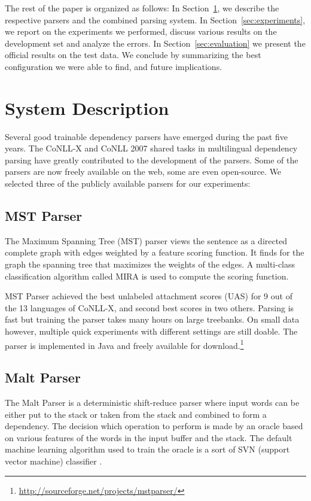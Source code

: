 \documentclass[11pt]{article}
\def\Sref#1{Section~\ref{#1}}
\def\microsection#1{{\bf #1.}}
\begin{document}
The rest of the paper is organized as follows: In \Sref{sec:system}, we describe the respective parsers and the combined parsing system. In \Sref{sec:experiments}, we report on the experiments we performed, discuss various results on the development set and analyze the errors. In \Sref{sec:evaluation} we present the official results on the test data. We conclude by summarizing the best configuration we were able to find, and future implications.

\section{System Description}
\label{sec:system}

Several good trainable dependency parsers have emerged during the past five years. The CoNLL-X \citep{buchholz-marsi:2006:CoNLL-X} and CoNLL 2007 \citep{nivre-EtAl:2007:EMNLP-CoNLL2007} shared tasks in multilingual dependency parsing have greatly contributed to the development of the parsers. Some of the parsers are now freely available on the web, some are even open-source. We selected three of the publicly available parsers for our experiments:

\subsection{MST Parser}
\label{sec:mst}
The Maximum Spanning Tree (MST) parser \citep{mst} views the sentence as a directed complete graph with edges weighted by a feature scoring function. It finds for the graph the spanning tree that maximizes the weights of the edges. A multi-class classification algorithm called MIRA is used to compute the scoring function.

MST Parser achieved the best unlabeled attachment scores (UAS) for 9 out of the 13 languages of CoNLL-X, and second best scores in two others. Parsing is fast but training the parser takes many hours on large treebanks. On small data however, multiple quick experiments with different settings are still doable. The parser is implemented in Java and freely available for download.\footnote{\url{http://sourceforge.net/projects/mstparser/}}

\subsection{Malt Parser}
\label{sec:malt}
The Malt Parser  \citep{malt} is a deterministic shift-reduce parser where input words can be either put to the stack or taken from the stack and combined to form a dependency. The decision which operation to perform is made by an oracle based on various features of the words in the input buffer and the stack. The default machine learning algorithm used to train the oracle is a sort of SVN (support vector machine) classifier \citep{svm}.
\end{document}
